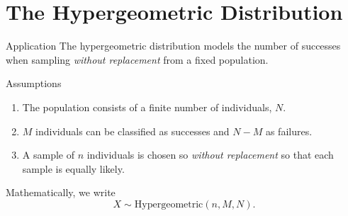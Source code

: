 \section{The Hypergeometric Distribution}

\begin{frame}

  \begin{block}{Application}
    The hypergeometric distribution models the number of successes when sampling \textit{without replacement} from a fixed population.

  \end{block}

  \begin{block}{Assumptions}
    \begin{enumerate}
    \item The population consists of a finite number of individuals, $N$.
    \item $M$ individuals can be classified as successes and $N-M$ as failures.
    \item A sample of $n$ individuals is chosen so \textit{without replacement} so that each sample is equally likely.
    \end{enumerate}
  \end{block}

  \bigskip

  Mathematically, we write
  \[
    X \sim \mbox{Hypergeometric}(n,M,N).
  \]
\end{frame}


